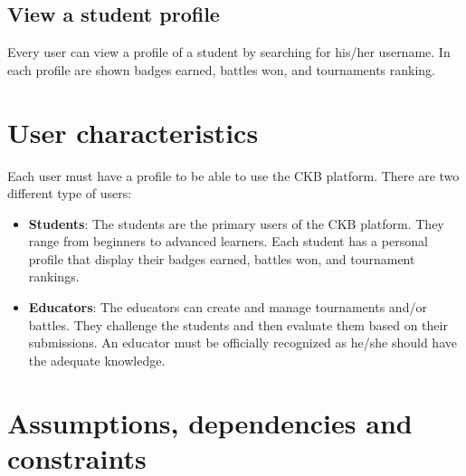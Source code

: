 \subsection{View a student profile}
Every user can view a profile of a student by searching for his/her username. In each profile are shown badges earned, battles won, and tournaments ranking.
\clearpage

\section{User characteristics}
Each user must have a profile to be able to use the CKB platform.
There are two different type of users:
\begin{itemize}
	\item \textbf{Students}:
	    The students are the primary users of the CKB platform. They range from beginners to advanced learners. Each student has a personal profile that display their badges earned, battles won, and tournament rankings. 
	\item \textbf{Educators}: 
		The educators can create and manage tournaments and/or battles. They challenge the students and then evaluate them based on their submissions. An educator must be officially recognized as he/she should have the adequate knowledge.
\end{itemize}

\section{Assumptions, dependencies and constraints}

